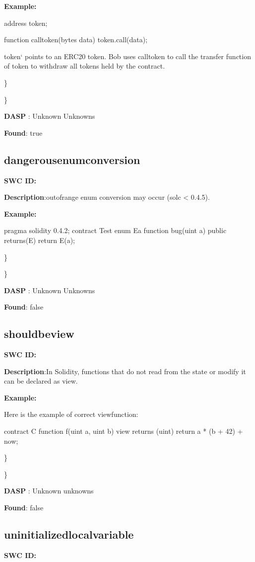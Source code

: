 \documentclass{article}
\begin{document}
{{\textbf{Example:} 

address token;

function call\textunderscore token(bytes data){
  token.call(data);
}

token` points to an ERC20 token. Bob uses call\textunderscore token to call the transfer function of token to withdraw all tokens held by the contract.

\} 

\} 

\textbf{DASP} : Unknown Unknowns

\textbf{Found}: true

\subsection{dangerous\textunderscore enum\textunderscore conversion} 
\textbf{SWC \textunderscore ID:} 

\textbf{Description}:out\textendash of\textendash range enum conversion may occur (solc < 0.4.5).


\textbf{Example:} 

pragma solidity 0.4.2;
contract Test{
  enum E{a}
  function bug(uint a) public returns(E){
        return E(a);
    }
}

\} 

\} 

\textbf{DASP} : Unknown Unknowns

\textbf{Found}: false

\subsection{should\textunderscore be\textunderscore view} 
\textbf{SWC \textunderscore ID:} 

\textbf{Description}:In Solidity, functions that do not read from the state or modify it can be declared as view.


\textbf{Example:} 

Here is the example of correct view\textendash function:

contract C {
    function f(uint a, uint b) view returns (uint) {
        return a * (b + 42) + now;
    }
}

\} 

\} 

\textbf{DASP} : Unknown unknowns

\textbf{Found}: false

\subsection{uninitialized\textunderscore local\textunderscore variable} 
\textbf{SWC \textunderscore ID:} 

}}
\end{document}
